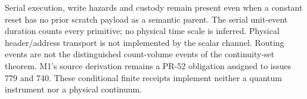 Serial execution, write hazards and custody remain present even when a
constant reset has no prior scratch payload as a semantic parent.  The
serial unit-event duration counts every primitive; no physical time scale
is inferred.  Physical header/address transport is not implemented by the
scalar channel.  Routing events are not the distinguished count-volume
events of the continuity-set theorem.  M1's source derivation remains a
PR-52 obligation assigned to issues 779 and 740.  These conditional finite
receipts implement neither a quantum instrument nor a physical continuum.
